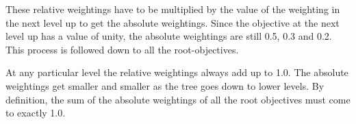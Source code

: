 These relative weightings have to be multiplied by the value of the weighting in the next level up to get the absolute weightings.
Since the objective at the next level up has a value of unity, the absolute weightings are still 0.5, 0.3 and 0.2.
This process is followed down to all the root-objectives. 

At any particular level the relative weightings always add up to 1.0.
The absolute weightings get smaller and smaller as the tree goes down to lower levels.
By definition, the sum of the absolute weightings of all the root objectives must come to exactly 1.0.



